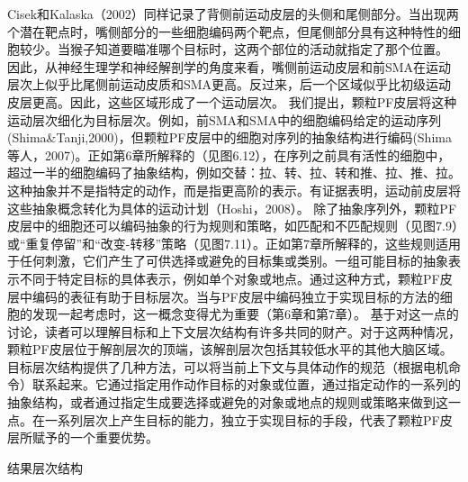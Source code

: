 Cisek和Kalaska（2002）同样记录了背侧前运动皮层的头侧和尾侧部分。当出现两个潜在靶点时，嘴侧部分的一些细胞编码两个靶点，但尾侧部分具有这种特性的细胞较少。当猴子知道要瞄准哪个目标时，这两个部位的活动就指定了那个位置。
因此，从神经生理学和神经解剖学的角度来看，嘴侧前运动皮层和前SMA在运动层次上似乎比尾侧前运动皮质和SMA更高。反过来，后一个区域似乎比初级运动皮层更高。因此，这些区域形成了一个运动层次。
我们提出，颗粒PF皮层将这种运动层次细化为目标层次。例如，前SMA和SMA中的细胞编码给定的运动序列(Shima\&Tanji,2000)，但颗粒PF皮层中的细胞对序列的抽象结构进行编码(Shima等人，2007)。正如第6章所解释的（见图6.12），在序列之前具有活性的细胞中，超过一半的细胞编码了抽象结构，例如交替：拉、转、拉、转和推、拉、推、拉。这种抽象并不是指特定的动作，而是指更高阶的表示。有证据表明，运动前皮层将这些抽象概念转化为具体的运动计划（Hoshi，2008）。
除了抽象序列外，颗粒PF皮层中的细胞还可以编码抽象的行为规则和策略，如匹配和不匹配规则（见图7.9）或“重复停留”和“改变-转移”策略（见图7.11）。正如第7章所解释的，这些规则适用于任何刺激，它们产生了可供选择或避免的目标集或类别。一组可能目标的抽象表示不同于特定目标的具体表示，例如单个对象或地点。通过这种方式，颗粒PF皮层中编码的表征有助于目标层次。当与PF皮层中编码独立于实现目标的方法的细胞的发现一起考虑时，这一概念变得尤为重要（第6章和第7章）。
基于对这一点的讨论，读者可以理解目标和上下文层次结构有许多共同的财产。对于这两种情况，颗粒PF皮层位于解剖层次的顶端，该解剖层次包括其较低水平的其他大脑区域。目标层次结构提供了几种方法，可以将当前上下文与具体动作的规范（根据电机命令）联系起来。它通过指定用作动作目标的对象或位置，通过指定动作的一系列的抽象结构，或者通过指定生成要选择或避免的对象或地点的规则或策略来做到这一点。在一系列层次上产生目标的能力，独立于实现目标的手段，代表了颗粒PF皮层所赋予的一个重要优势。


结果层次结构

